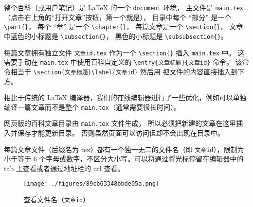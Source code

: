 整个百科（或用户笔记）是 LaTeX 的一个 \verb|document| 环境， 主文件是 \verb|main.tex|（点击右上角的“打开文章”按钮，第一个就是）， 目录中每个 “部分” 是一个 \verb|\part{}|， 每个 “章” 是一个 \verb|\chapter{}|， 每篇文章是一个 \verb|\section{}|， 文章中蓝色的小标题是 \verb|\subsection{}|， 黑色的小标题是 \verb|\subsubsection{}|。

每篇文章拥有独立文件 \verb|文章id.tex| 作为一个 \verb|\section{}| 插入 \verb|main.tex| 中。 这需要手动在 \verb|main.tex| 中使用百科自定义的 \verb|\entry{文章标题}{文章id}| 命令。 该命令相当于 \verb|\section{文章标题}\label{文章id}| 然后用 \verb|| 把文件的内容直接插入到下方。

相比于传统的 LaTeX 编译器，我们的在线编辑器进行了一些优化，例如可以单独编译一篇文章而不是整个 \verb`main.tex`（通常需要很长时间）。

网页版的百科文章目录由 \verb|main.tex| 文件生成， 所以必须把新建的文章在这里插入并保存才能更新目录。 否则虽然页面可以访问但却不会出现在目录中。

每篇文章文件（后缀名为 tex）都有一个独一无二的文件名（即 \verb`文章id`），限制为小于等于 6 个字母或数字，不区分大小写。可以将通过将光标停留在编辑器中的 tab 上查看或者通过地址栏的 url 查看。

\begin{figure}[ht]
\centering
\texttt{[image: ./figures/89cb63348bbde05a.png]}
\caption{查看文件名（\verb`文章id`）} \label{fig_editor_2}
\end{figure}

